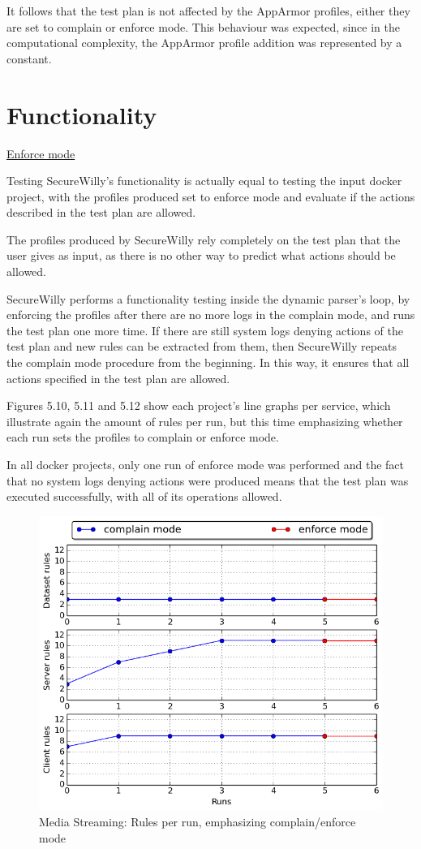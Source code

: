 It follows that the test plan is not affected by the AppArmor profiles, either they are set to complain or enforce mode. This behaviour was expected, since in the computational complexity, the AppArmor profile addition was represented by a constant.

\section{Functionality}
\underline{Enforce mode}
\hfill\break

Testing SecureWilly's functionality is actually equal to testing the input docker project, with the profiles produced set to enforce mode and evaluate if the actions described in the test plan are allowed.

The profiles produced by SecureWilly rely completely on the test plan that the user gives as input, as there is no other way to predict what actions should be allowed.  

SecureWilly performs a functionality testing inside the dynamic parser's loop, by enforcing the profiles after there are no more logs in the complain mode, and runs the test plan one more time. If there are still system logs denying actions of the test plan and new rules can be extracted from them, then SecureWilly repeats the complain mode procedure from the beginning. In this way, it ensures that all actions specified in the test plan are allowed.

Figures 5.10, 5.11 and 5.12 show each project's line graphs per service, which illustrate again the amount of rules per run, but this time emphasizing whether each run sets the profiles to complain or enforce mode.

In all docker projects, only one run of enforce mode was performed and the fact that no system logs denying actions were produced means that the test plan was executed successfully, with all of its operations allowed.

\hfill\break

\begin{figure}[h!]
  \centering
   \includegraphics[width=0.8\linewidth]{../figures/mediastreaming/complain_enforce_rules.png}
   \caption{Media Streaming: Rules per run, emphasizing complain/enforce mode}
\end{figure}

